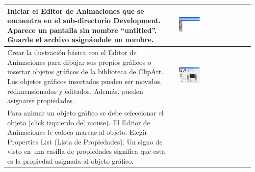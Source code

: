 \begin{table}[H]
\centering
\renewcommand*{\arraystretch}{0.01}
\begin{tabular}{*{2}{m{}}}
   \hline
	Iniciar el Editor de Animaciones que se encuentra en el sub-directorio 
	Development. Aparece un pantalla sin nombre ``untitled''. Guarde el
	archivo asignándole un nombre.
	&\begin{center}
	 \includegraphics[width=0.3\textwidth]
	{Cap5-SCADA/images/animEdit.jpeg}
	\end{center}\\
   \hline
    	Crear la ilustración básica con el Editor de Animaciones para  
	dibujar sus propios gráficos o insertar objetos gráficos de 
	la biblioteca de ClipArt. Los objetos gráficos insertados pueden ser 
	movidos, redimensionados y editados. Además, pueden asignarse 
	propiedades.
	&\begin{center}
	   \includegraphics[width=0.3\textwidth]
	{Cap5-SCADA/images/animEdit1.jpeg}
	\end{center}\\
   \hline
	  Para animar un objeto gráfico se debe seleccionar 
	  el objeto (click izquierdo del mouse). El Editor de Animaciones le 
	  coloca marcas al objeto. Elegir Properties List (Lista de 
	  Propiedades). Un signo de visto en una casilla de propiedades 
	  significa que esta es la propiedad asignada al objeto gráfico. 
	&\begin{center}
	   \includegraphics[width=0.4\textwidth]

\end{center}
\end{tabular}
\end{table}
